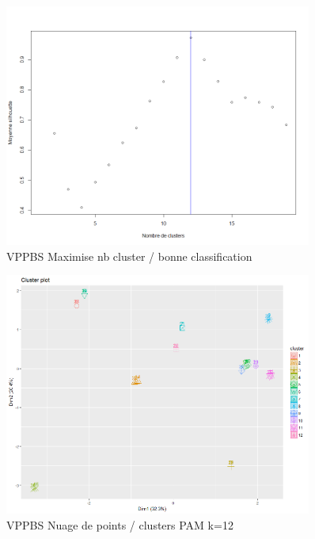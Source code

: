 %
%

\begin{figure}[H]
\centering
\includegraphics[width=0.90\textwidth]{../Fig/VPPBS/vppbs-elbow-pre.png}
\caption{VPPBS Maximise nb cluster / bonne classification}
\end{figure}

\begin{figure}[H]
\centering
\includegraphics[width=0.90\textwidth]{../Fig/VPPBS/vppbs-pam-k12.png}
\caption{VPPBS Nuage de points / clusters PAM k=12 }
\end{figure}

